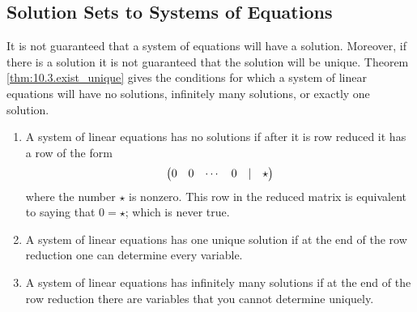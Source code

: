 \subsection*{Solution Sets to Systems of Equations}
It is not guaranteed that a system of equations will have a solution.  Moreover, if there
is a solution it is not guaranteed that the solution will be unique. Theorem
\ref{thm:10.3.exist_unique} gives the conditions for which a system of linear equations
will have no solutions, infinitely many solutions, or exactly one solution.

\begin{thm}
    \begin{enumerate}
        \item A system of linear equations has no solutions if after it is row reduced it
            has a row of the form
            \[ \begin{pmatrix} 0 & 0 & \cdots & 0 & | & \star \end{pmatrix} \]
            where the number $\star$ is nonzero.  This row in the reduced matrix is
            equivalent to saying that $0 = \star$; which is never true.
        \item A system of linear equations has one unique solution if at the end of the
            row reduction one can determine every variable.
        \item A system of linear equations has infinitely many solutions if at the end of
            the row reduction there are variables that you cannot determine uniquely.
    \end{enumerate}
    \label{thm:10.3.exist_unique}
\end{thm}


